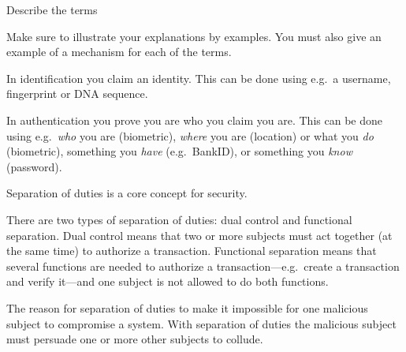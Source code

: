 \question[3]\label{q:auth:E:C}
  Describe the terms
  Make sure to illustrate your explanations by examples.
  You must also give an example of a mechanism for each of the terms.

  \begin{solution}
    In identification you claim an identity.
    This can be done using e.g.~a username, fingerprint or DNA sequence.

    In authentication you prove you are who you claim you are.
    This can be done using e.g.~\emph{who} you are (biometric), \emph{where} 
    you are (location) or what you \emph{do} (biometric), something you 
    \emph{have} (e.g.~BankID), or something you \emph{know} (password).
  \end{solution}


  
\question[3]\label{q:accountability:E:C}
  Separation of duties is a core concept for security.

  \begin{solution}
    There are two types of separation of duties:
    dual control and functional separation.
    Dual control means that two or more subjects must act together (at the same 
    time) to authorize a transaction.
    Functional separation means that several functions are needed to authorize 
    a transaction---e.g.~create a transaction and verify it---and one subject 
    is not allowed to do both functions.

    The reason for separation of duties to make it impossible for one malicious 
    subject to compromise a system.
    With separation of duties the malicious subject must persuade one or more 
    other subjects to collude.
  \end{solution}


